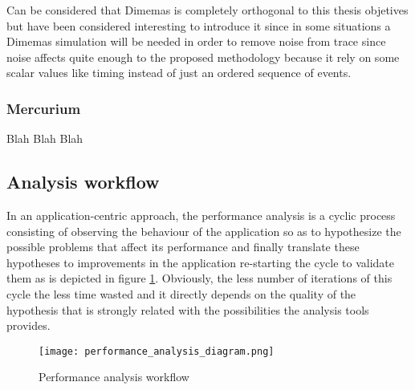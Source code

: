 Can be considered that Dimemas is completely orthogonal to this thesis objetives
but have been considered interesting to introduce it since in some situations a
Dimemas simulation will be needed in order to remove noise from trace since
noise affects quite enough to the proposed methodology because it rely on some
scalar values like timing instead of just an ordered sequence of events.

\subsubsection{Mercurium}\label{ss:mercurium}

Blah Blah Blah

\subsection{Analysis workflow}\label{ss:analysis_workflow}

In an application-centric approach, the performance analysis is a cyclic process 
consisting of observing the behaviour of the application so as to hypothesize the 
possible problems that affect its performance and finally translate these 
hypotheses to improvements in the application re-starting the cycle to validate 
them as is depicted in figure \ref{fig:perf_analysis_workflow}. Obviously, the 
less number of iterations of this cycle the less time wasted and it directly 
depends on the quality of the hypothesis that is strongly related with the 
possibilities the analysis tools provides.

\begin{figure}[]
  \centering
  \texttt{[image: performance\_analysis\_diagram.png]}
  \caption{Performance analysis workflow}
  \label{fig:perf_analysis_workflow}
\end{figure}

